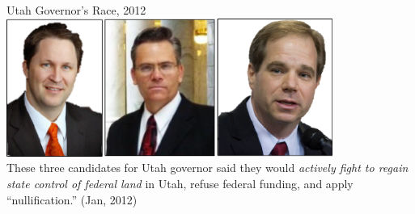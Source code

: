 \begin{frame}{Utah Governor's Race, 2012}
    \centering
    \includegraphics[width=0.8\textwidth,height=.5\textwidth,keepaspectratio=true]{img/gov.png} \\
    { \Large These three candidates for Utah governor said they would \emph{actively fight to regain state control of federal land} in Utah, refuse federal funding, and apply ``nullification.'' (Jan, 2012) \\ }
\end{frame}

